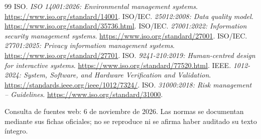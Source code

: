 \documentclass[10pt,a4paper]{article}
\begin{document}
\begin{thebibliography}{99}
 ISO. \textit{ISO 14001:2026: Environmental management systems}. \url{https://www.iso.org/standard/14001}.
 ISO/IEC. \textit{25012:2008: Data quality model}. \url{https://www.iso.org/standard/35736.html}.
 ISO/IEC. \textit{27001:2022: Information security management systems}. \url{https://www.iso.org/standard/27001}.
 ISO/IEC. \textit{27701:2025: Privacy information management systems}. \url{https://www.iso.org/standard/27701}.
 ISO. \textit{9241-210:2019: Human-centred design for interactive systems}. \url{https://www.iso.org/standard/77520.html}.
 IEEE. \textit{1012-2024: System, Software, and Hardware Verification and Validation}. \url{https://standards.ieee.org/ieee/1012/7324/}.
 ISO. \textit{31000:2018: Risk management -- Guidelines}. \url{https://www.iso.org/standard/31000}.
\end{thebibliography}
\footnotesize Consulta de fuentes web: 6 de noviembre de 2026. Las normas se documentan mediante sus fichas oficiales; no se reproduce ni se afirma haber auditado su texto íntegro.
\end{document}
